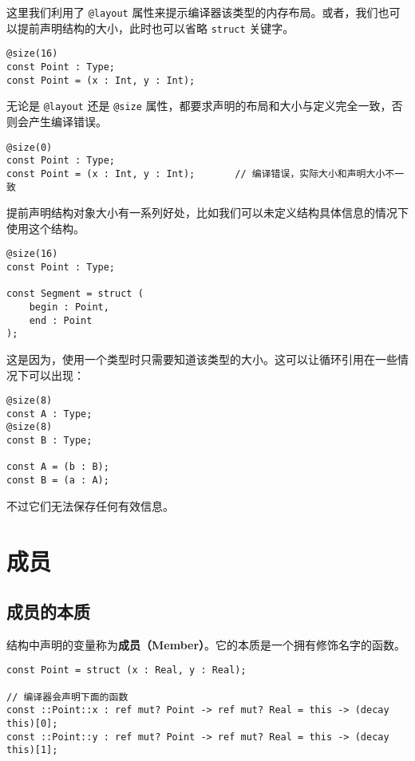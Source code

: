 这里我们利用了 \lstinline!@layout! 属性来提示编译器该类型的内存布局。或者，我们也可以提前声明结构的大小，此时也可以省略 \lstinline!struct! 关键字。

\begin{lstlisting}
@size(16)
const Point : Type;
const Point = (x : Int, y : Int);
\end{lstlisting}

无论是 \lstinline!@layout! 还是 \lstinline!@size! 属性，都要求声明的布局和大小与定义完全一致，否则会产生编译错误。

\begin{lstlisting}
@size(0)
const Point : Type;
const Point = (x : Int, y : Int);		// 编译错误，实际大小和声明大小不一致
\end{lstlisting}

提前声明结构对象大小有一系列好处，比如我们可以未定义结构具体信息的情况下使用这个结构。

\begin{lstlisting}
@size(16)
const Point : Type;

const Segment = struct (
	begin : Point,
	end : Point
);
\end{lstlisting}

这是因为，使用一个类型时只需要知道该类型的大小。这可以让循环引用在一些情况下可以出现：

\begin{minipage}[c]{0.95\textwidth}
\vspace{1.0em}
\begin{lstlisting}
@size(8)
const A : Type;
@size(8)
const B : Type;

const A = (b : B);
const B = (a : A);
\end{lstlisting}
\end{minipage}

不过它们无法保存任何有效信息。

\section{成员}

\subsection{成员的本质}

结构中声明的变量称为\textbf{成员（Member）}。它的本质是一个拥有修饰名字的函数。

\begin{lstlisting}
const Point = struct (x : Real, y : Real);

// 编译器会声明下面的函数
const ::Point::x : ref mut? Point -> ref mut? Real = this -> (decay this)[0];
const ::Point::y : ref mut? Point -> ref mut? Real = this -> (decay this)[1];
\end{lstlisting}

